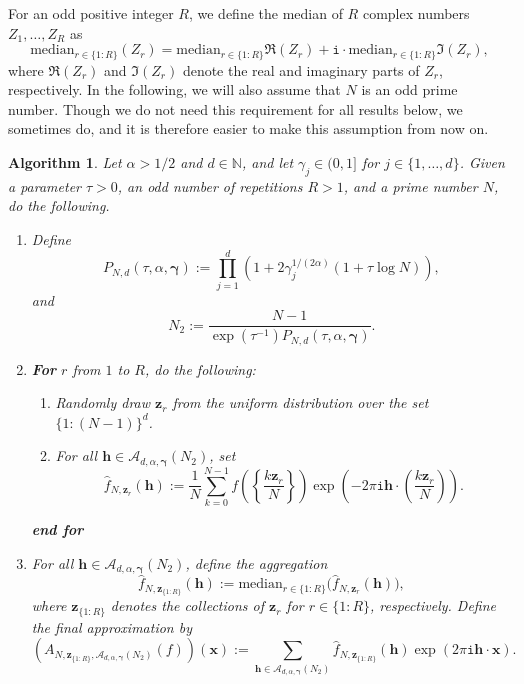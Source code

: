 \documentclass[a4paper,11pt]{article}
\newtheorem{algorithm}[theorem]{Algorithm}
\newcommand{\bsh}{\boldsymbol{h}}
\newcommand{\bsx}{\boldsymbol{x}}
\newcommand{\bsz}{\boldsymbol{z}}
\newcommand{\bsgamma}{\boldsymbol{\gamma}}
\newcommand{\NN}{\mathbb{N}}
\newcommand{\Acal}{\mathcal{A}}
\newcommand{\icomp}{\mathtt{i}}
\begin{document}
For an odd positive integer $R$, we define the median of $R$ complex numbers $Z_1,\dots,Z_R$ as
\begin{equation}\label{eqn:complexmedian}
    \mathrm{median}_{r\in\{1{:}R\}}(Z_r)=\mathrm{median}_{r\in\{1{:}R\}} \Re(Z_r) + \icomp\cdot \mathrm{median}_{r\in\{1{:}R\}} \Im(Z_r),
\end{equation}
where $\Re(Z_r)$ and $\Im(Z_r)$ denote the real and imaginary parts of $Z_r$, respectively.
In the following, we will also assume that $N$ is an odd prime 
number. Though we do not need this requirement for all results below, we sometimes do, and it is therefore easier to make this assumption from now on.
\begin{algorithm}\label{alg:median}
    Let $\alpha>1/2$ and $d \in \NN$, and let $\gamma_j \in (0,1]$ for 
    $j \in \{1, \ldots, d\}$. Given  a parameter $\tau > 0$, an odd number of repetitions $R >1$, and a prime number $N$, do the following.
    \begin{enumerate}
        \item Define 
        \begin{equation}\label{eqn:PN}
        P_{N,d}(\tau,\alpha,\bsgamma):=\prod_{j=1}^d \left(1+ 2\gamma_j^{1/(2\alpha)} (1+\tau\log N)\right),
        \end{equation}
        and
        \begin{equation}\label{eqn:Nstar}
        N_2:=\frac{N-1 }{\exp(\tau^{-1})P_{N,d}(\tau,\alpha,\bsgamma)}.
        \end{equation}
        \item \textbf{For} $r$ from $1$ to $R$, do the following:
        \begin{enumerate}
            \item Randomly draw $\bsz_{r}$ from the uniform distribution over the set $\{1{:}(N-1)\}^d$.
            \item For all $\bsh\in \Acal_{d,\alpha,\bsgamma}(N_2)$, set
            \[ 
            \widehat{f}_{N,\bsz_r}(\bsh):=
            \frac{1}{N} \sum_{k=0}^{N-1} f\left( \left\{ \frac{k \bsz_r}{N} \right\}\right)\exp\left(-2\pi \icomp \bsh \cdot \left( \frac{k \bsz_r}{N}\right)\right).
            \]   
        \end{enumerate}
       \textbf{end for}
       \item For all $\bsh\in \Acal_{d,\alpha,\bsgamma}(N_2)$, define the aggregation
        \[ 
            \widehat{f}_{N,\bsz_{\{1{:}R\}}}(\bsh):=\mathrm{median}_{r\in\{1{:}R\}} \Big(\widehat{f}_{N,\bsz_r}(\bsh)\Big),
       \]
       where $\bsz_{\{1{:}R\}}$ denotes the collections of $\bsz_r$ for $r\in\{1{:}R\}$, respectively.
       Define the final approximation by
        \[ 
        (A_{N,\bsz_{\{1{:}R\}},\Acal_{d,\alpha,\bsgamma}(N_2)}(f))(\bsx):= \sum_{\bsh \in \Acal_{d,\alpha,\bsgamma}(N_2)} \widehat{f}_{N,\bsz_{\{1{:}R\}}}(\bsh) \exp (2 \pi \icomp \bsh \cdot \bsx).\]
\end{enumerate}
\end{algorithm}
\end{document}
